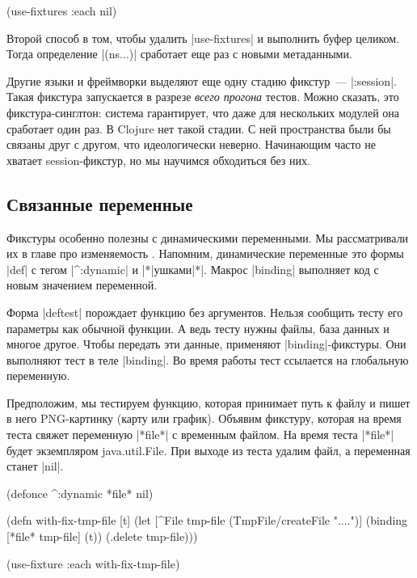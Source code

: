\begin{english}
  \begin{clojure}
(use-fixtures :each nil)
  \end{clojure}
\end{english}

Второй способ в том, чтобы удалить \spverb|use-fixtures| и выполнить буфер
целиком. Тогда определение \spverb|(ns...)| сработает еще раз с новыми
метаданными.

Другие языки и фреймворки выделяют еще одну стадию фикстур~---
\spverb|:session|. Такая фикстура запускается в разрезе \emph{всего прогона}
тестов. Можно сказать, это фикстура-синглтон: система гарантирует, что даже для
нескольких модулей она сработает один раз. В Clojure нет такой стадии. С ней
пространства были бы связаны друг с другом, что идеологически
неверно. Начинающим часто не хватает session-фикстур, но мы научимся обходиться
без них.

\subsection{Связанные переменные}

Фикстуры особенно полезны с динамическими переменными. Мы рассматривали их в
главе про изменяемость . Напомним, динамические переменные
это формы \spverb|def| с тегом \spverb|^:dynamic| и
\spverb|*|ушками\spverb|*|. Макрос \spverb|binding| выполняет код с новым
значением переменной.

Форма \spverb|deftest| порождает функцию без аргументов. Нельзя сообщить тесту
его параметры как обычной функции. А ведь тесту нужны файлы, база данных и
многое другое. Чтобы передать эти данные, применяют
\spverb|binding|-фикстуры. Они выполняют тест в теле \spverb|binding|. Во время
работы тест ссылается на глобальную переменную.

Предположим, мы тестируем функцию, которая принимает путь к файлу и пишет в него
PNG-картинку (карту или график). Объявим фикстуру, которая на время теста свяжет
переменную \spverb|*file*| с временным файлом. На время теста \spverb|*file*|
будет экземпляром java.util.File. При выходе из теста удалим файл, а переменная
станет \spverb|nil|.

\begin{english}
  \begin{clojure}
(defonce ^:dynamic *file* nil)

(defn with-fix-tmp-file [t]
  (let [^File tmp-file (TmpFile/createFile "....")]
    (binding [*file* tmp-file]
      (t))
    (.delete tmp-file)))

(use-fixture :each with-fix-tmp-file)
  \end{clojure}
\end{english}

